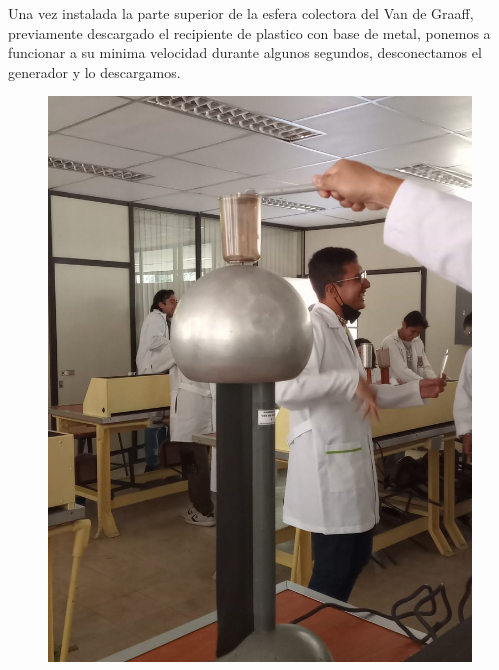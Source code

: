 \documentclass[10pt]{article}
\begin{document}
\begin{multicols}{2}
Una vez instalada la parte superior de la esfera colectora del Van de Graaff, previamente descargado el recipiente de plastico con base de metal, ponemos a funcionar a su minima velocidad durante algunos segundos, desconectamos el generador y lo descargamos.

\begin{figure}[h]
\centering
\includegraphics[scale=0.07]{p10}

\end{figure}
\end{multicols}
\end{document}
